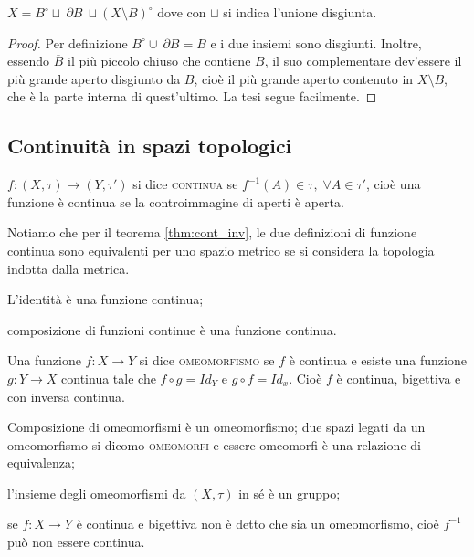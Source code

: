 \documentclass{article}
\begin{document}
\begin{ftt}
	$X= B^{\circ} \sqcup\ \partial B\ \sqcup (X
	\setminus B)^{\circ}$ dove con $\sqcup$ si indica l'unione disgiunta.
\end{ftt}

\begin{proof}
	Per definizione $B^{\circ} \cup\ \partial B=\overline{B}$ e i due insiemi
	sono disgiunti. Inoltre, essendo $\overline B$ il più piccolo chiuso che
	contiene $B$, il suo complementare dev'essere il più grande aperto disgiunto
	da $B$, cioè il più grande aperto contenuto in $X \setminus B$, che è la
	parte interna di quest'ultimo. La tesi segue facilmente.
\end{proof}

\subsection{Continuità in spazi topologici}

\begin{defn}
    $f: (X, \tau) \rightarrow (Y, \tau')$ si dice \textsc{continua} se
    ${f^{-1}(A) \in \tau,}\; {\forall A \in \tau'}$, cioè una funzione \`e
    continua se la controimmagine di aperti \`e aperta.
\end{defn}

Notiamo che per il teorema \ref{thm:cont_inv}, le due
definizioni di funzione continua sono equivalenti per uno spazio metrico se si
considera la topologia indotta dalla metrica.

\begin{thm}
    \begin{nlist}
        \item L'identità è una funzione continua;
        \item composizione di funzioni continue è una funzione continua.
    \end{nlist}
\end{thm}

\begin{defn}
    Una funzione $f: X \rightarrow Y$ si dice \textsc{omeomorfismo} se $f$ è
    continua e esiste una funzione $g:Y\rightarrow X$ continua tale che $f \circ
    g = Id_Y$ e $g \circ f = Id_x$. Cio\`e $f$ \`e continua, bigettiva e con
    inversa continua.
\end{defn}

\begin{oss}
	\begin{nlist}
	\item Composizione di omeomorfismi è un omeomorfismo; due spazi legati da un
	omeomorfismo si dicomo \textsc{omeomorfi} e essere omeomorfi è una relazione
	di equivalenza;
	\item l'insieme degli omeomorfismi da $(X, \tau)$ in sé è un gruppo;
	\item se $f:X \rightarrow Y$ è continua e bigettiva non è detto che sia un
	omeomorfismo, cioè $f^{-1}$ può non essere continua.
    \marginpar{\warningsign}
\end{nlist}
\end{oss}
\end{document}
